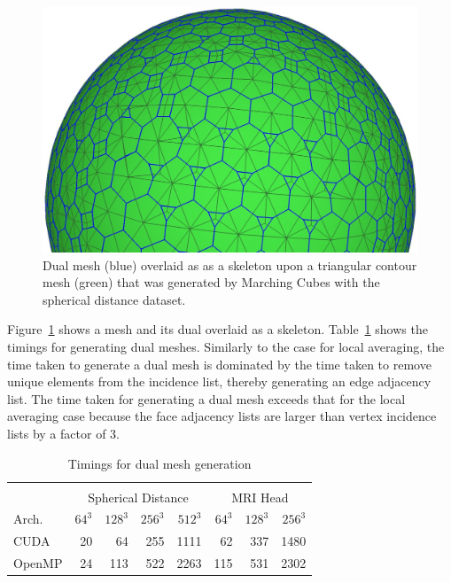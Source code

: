 \documentclass[10pt,journal,cspaper,compsoc]{IEEEtran}
\begin{document}
\begin{figure}[!tb]
\begin{center}
\includegraphics[width=\linewidth]{DualMeshSkeleton.jpg}
\end{center}
\caption{Dual mesh (blue) overlaid as as a skeleton upon a triangular contour mesh (green) that was generated by Marching Cubes with the spherical distance dataset.}
\label{fig:DualMeshSkeleton}
\end{figure}
Figure~\ref{fig:DualMeshSkeleton} shows a mesh and its dual overlaid as a skeleton. Table~\ref{tab:timingsdualmesh} shows the timings for generating dual meshes. Similarly to the case for local averaging, the time taken to generate a dual mesh is dominated by the time taken to remove unique elements from the incidence list, thereby generating an edge adjacency list. The time taken for generating a dual mesh exceeds that for the local averaging case because the face adjacency lists are larger than vertex incidence lists by a factor of 3. 

\begin{table}[tb!]
\begin{center}
\caption{Timings for dual mesh generation}
\label{tab:timingsdualmesh}
\begin{tabular}{l|r r r r|r r r}
\multicolumn{8}{c}{ } \\
 & \multicolumn{4}{|c|}{Spherical Distance} & \multicolumn{3}{|c}{MRI Head}\\
Arch. & $64^3$ & $128^3$ & $256^3$ & $512^3$ & $64^3$ & $128^3$ & $256^3$\\
\hline
CUDA & 20 & 64 & 255 & 1111 & 62 & 337 & 1480 \\
OpenMP & 24 & 113 & 522 & 2263 & 115 & 531 & 2302
\end{tabular}
\end{center}
\vspace{-0.6cm}
\end{table}
\end{document}
